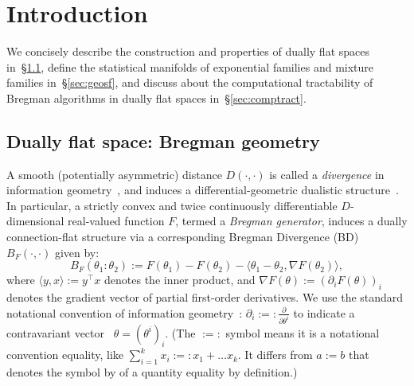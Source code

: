 \documentclass[graybox]{svmult}
\def\inner#1#2{{\langle #1,#2\rangle}}
\def\eqdef{:=}
\def\eqnota{:=:}
\begin{document}
\section{Introduction}

We concisely describe the construction and properties of dually flat spaces~\cite{IG-2014,IG-2016} in~\S\ref{sec:dfsbg}, 
define the statistical manifolds of exponential families and mixture families in~\S\ref{sec:geosf},  and discuss about the computational tractability of Bregman algorithms in dually flat spaces in~\S\ref{sec:comptract}.


\subsection{Dually flat space: Bregman geometry}\label{sec:dfsbg}
A smooth (potentially asymmetric) distance $D(\cdot,\cdot)$ is called a {\em divergence} in information geometry~\cite{IG-2014,IG-2016}, and induces a differential-geometric dualistic structure~\cite{Eguchi-1992,IGDiv-2010,IG-2014,IG-2016}. 
In particular, a strictly convex and twice continuously differentiable $D$-dimensional real-valued function $F$, termed a {\em Bregman generator}, induces 
a dually connection-flat structure via a corresponding  Bregman Divergence (BD)~\cite{Bregman-2005} $B_F(\cdot,\cdot)$ given by:  
\begin{equation}
B_F(\theta_1:\theta_2) \eqdef F(\theta_1)-F(\theta_2)-\inner{\theta_1-\theta_2}{\nabla F(\theta_2)},
\end{equation}
where $\inner{y}{x} \eqdef y^\top x$ denotes the inner product, and $\nabla F(\theta)\eqdef (\partial_i F(\theta))_i$ denotes the gradient vector of partial first-order derivatives. We use the standard notational convention of information geometry~\cite{IG-2014,IG-2016}: 
$\partial_i \eqnota \frac{\partial}{\partial \theta^i}$ to indicate a contravariant vector~\cite{tensor-2011} $\theta=(\theta^i)_i$.
(The $\eqnota$ symbol means it is a notational convention equality, like $\sum_{i=1}^k x_i \eqnota x_1+\ldots x_k$. 
It differs from $a\eqdef b$ that denotes the symbol by of a quantity equality by definition.)
\end{document}
